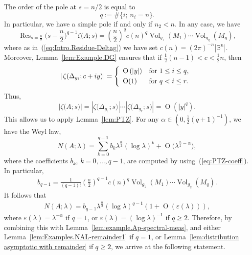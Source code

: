 \documentclass[10pt, a4paper]{amsart}
\newcommand{\bB}{\mathbb{B}}
\newcommand{\op}{\operatorname}
\newcommand{\Vol}{\op{Vol}}
\newcommand{\Res}{\op{Res}}
\numberwithin{equation}{section}
\theoremstyle{definition}
\theoremstyle{remark}
\begin{document}
The order of the pole at $s=n/2$ is equal to
\begin{equation}\label{eq:def of q}
 q:=\#\{i;\ n_i=n\}.
\end{equation}
In particular, we have a simple pole if and only if $n_2<n$. In any case, we have
\begin{equation*}
 \Res_{s=\frac{n}{2}}  \big(s-\frac{n}{2}\big)^{q-1}\zeta\big(A;s\big) = \left(\frac{n}{2}\right)^q c(n)^q \Vol_{g_1}(M_1)\cdots \Vol_{g_q}(M_q),
\end{equation*}
where as in~(\ref{eq:Intro.Residue-Deltag}) we have set $c(n)=(2\pi)^{-n}|\bB^n|$. Moreover, Lemma~\ref{lem:Example.DG} ensures that if $\frac1{2}(n-1)<c<\frac1{2}n$, then 
\begin{equation*}
 \left| \zeta(\Delta_{g_i};c+iy)\right| =  \left\{ 
 \begin{array}{ll} 
  \op{O}\left(|y|\right) & \textup{for}\ 1\leq i \leq q, \smallskip \\
   \op{O}(1) & \textup{for}\ q< i \leq r. 
\end{array}
\right.  
\end{equation*}
Thus, 
\begin{equation*}
  \left| \zeta\big(A;s\big)\right|=   \left|\zeta\big( \Delta_{g_1};s\big)\right|\cdots  \left|\zeta\big( \Delta_{g_r};s\big)\right| =  \op{O}\left(|y|^q\right). 
\end{equation*}
This allows us to apply Lemma~\ref{lem:PTZ}. For any $\alpha \in (0, \frac{1}{2}(q+1)^{-1})$, we have the Weyl law, 
\begin{equation}\label{eq:Examples.WL-multiL}
 N(A; \lambda) = \sum_{k=0}^{q-1} b_k \lambda^{\frac{n}{2}} (\log \lambda)^k + \op{O}\big( \lambda^{\frac{n}{2}-\alpha}\big), 
  \end{equation}
where the coefficients $b_k$, $k=0, \ldots, q-1$, are computed by using~(\ref{eq:PTZ-coeff}). In particular, 
\begin{gather*}
 b_{q-1} =  \frac{1}{(q-1)!} \left(\frac{n}{2}\right)^{q-1}c(n)^q \Vol_{g_1}(M_1)\cdots \Vol_{g_q}(M_q). 
\end{gather*}
 It follows that 
\begin{gather*}
  N(A; \lambda) = b_{q-1} \lambda^{\frac{n}{2}} (\log \lambda)^{q-1} 
 \left(1+  \op{O}\left(\varepsilon(\lambda)\right)\right), 
\end{gather*}
where $ \varepsilon(\lambda)= \lambda^{-\alpha} $ if $q=1$,  or $ \varepsilon(\lambda)= (\log \lambda)^{-1} $ if $q\geq 2$. Therefore, by combining this with Lemma~\ref{lem:example.Ap-spectral-meas}, and either Lemma~\ref{lem:Examples.NAL-remainder1} if $q=1$, or Lemma~\ref{lem:distribution asymptotic with remainder} if $q\geq 2$, we arrive at the following statement. 
\end{document}
